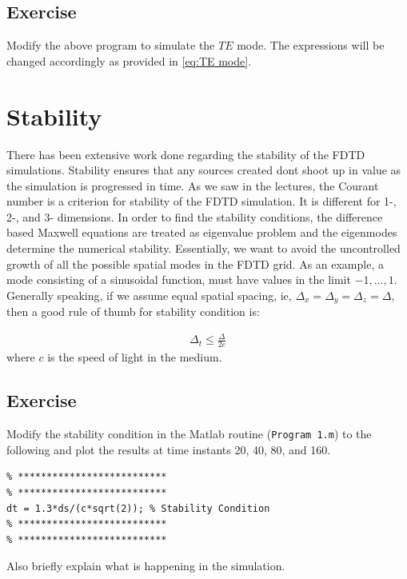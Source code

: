 \documentclass[12pt]{article}
\begin{document}
\subsection*{Exercise}

\begin{mdframed}[backgroundcolor=blue!20]
  Modify the above program to simulate the $TE$ mode. The expressions will be changed accordingly as provided in \eqref{eq:TE mode}.
\end{mdframed}


\section{Stability}

There has been extensive work done regarding the stability of the FDTD simulations. Stability ensures that any sources created dont shoot up in value as the simulation is progressed in time. As we saw in the lectures, the Courant number is a criterion for stability of the FDTD simulation. It is different for 1-, 2-, and 3- dimensions. In order to find the stability conditions, the difference based Maxwell equations are treated as eigenvalue problem and the eigenmodes determine the numerical stability. Essentially, we want to avoid the uncontrolled growth of all the possible spatial modes in the FDTD grid. As an example, a mode consisting of a sinusoidal function, must have values in the limit $-1 , \dots, 1$. Generally speaking, if we assume equal spatial spacing, ie, $\Delta_x = \Delta_y = \Delta_z = \Delta$, then a good rule of thumb for stability condition is:

\begin{align}
  \Delta_t \le \frac{\Delta}{2c}
\end{align}
where $c$ is the speed of light in the medium.

\subsection*{Exercise}

\begin{mdframed}[backgroundcolor=blue!20]

  Modify the stability condition in the Matlab routine (\texttt{Program 1.m}) to the following and plot the results at time instants 20, 40, 80, and 160.
  \scriptsize
  \begin{verbatim}
% **************************
% **************************
dt = 1.3*ds/(c*sqrt(2)); % Stability Condition
% **************************
% **************************
  \end{verbatim}
\end{mdframed}
Also briefly explain what is happening in the simulation.
\end{document}
